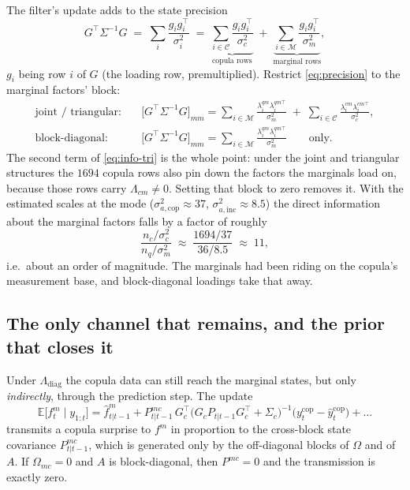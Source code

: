 \documentclass[11pt]{article}
\newcommand{\cop}{\mathrm{cop}}
\begin{document}
The filter's update adds to the state precision
\begin{equation}
  G^{\top}\Sigma^{-1}G \;=\; \sum_{i} \frac{g_i g_i^{\top}}{\sigma_i^2}
  \;=\; \underbrace{\sum_{i\in\mathcal{C}} \frac{g_i g_i^{\top}}{\sigma_c^2}}_{\text{copula rows}}
  \;+\; \underbrace{\sum_{i\in\mathcal{M}} \frac{g_i g_i^{\top}}{\sigma_m^2}}_{\text{marginal rows}},
  \label{eq:precision}
\end{equation}
$g_i$ being row $i$ of $G$ (the loading row, premultiplied). Restrict
\eqref{eq:precision} to the marginal factors' block:
\begin{align}
  \text{joint / triangular:}&\quad
  \bigl[G^{\top}\Sigma^{-1}G\bigr]_{mm} =
  \sum_{i\in\mathcal{M}} \frac{\lambda^{qm}_i \lambda^{qm\top}_i}{\sigma_m^2}
  \;+\; \sum_{i\in\mathcal{C}} \frac{\lambda^{cm}_i \lambda^{cm\top}_i}{\sigma_c^2},
  \label{eq:info-tri}\\[2pt]
  \text{block-diagonal:}&\quad
  \bigl[G^{\top}\Sigma^{-1}G\bigr]_{mm} =
  \sum_{i\in\mathcal{M}} \frac{\lambda^{qm}_i \lambda^{qm\top}_i}{\sigma_m^2}
  \qquad\text{only.}
  \label{eq:info-diag}
\end{align}
The second term of \eqref{eq:info-tri} is the whole point: under the joint and
triangular structures the $1694$ copula rows also pin down the factors the
marginals load on, because those rows carry $\Lambda_{cm} \neq 0$. Setting that
block to zero removes it. With the estimated scales at the mode
($\sigma^2_{a,\cop} \approx 37$, $\sigma^2_{a,\mathrm{inc}} \approx 8.5$) the
direct information about the marginal factors falls by a factor of roughly
\begin{equation}
  \frac{n_c/\sigma_c^2}{n_q/\sigma_m^2}
  \;\approx\; \frac{1694/37}{36/8.5} \;\approx\; 11 ,
\end{equation}
i.e.\ about an order of magnitude. The marginals had been riding on the
copula's measurement base, and block-diagonal loadings take that away.

\subsection{The only channel that remains, and the prior that closes it}

Under $\Lambda_{\mathrm{diag}}$ the copula data can still reach the marginal
states, but only \emph{indirectly}, through the prediction step. The update
\begin{equation}
  \mathbb{E}\bigl[f^m_t \mid y_{1:t}\bigr]
  = \hat f^m_{t|t-1}
  + P_{t|t-1}^{mc}\, G_c^{\top}\bigl(G_c P_{t|t-1} G_c^{\top} + \Sigma_c\bigr)^{-1}
    \bigl(y^{\cop}_t - \hat y^{\cop}_t\bigr) + \dots
  \label{eq:transmission}
\end{equation}
transmits a copula surprise to $f^m$ in proportion to the cross-block state
covariance $P^{mc}_{t|t-1}$, which is generated only by the off-diagonal blocks
of $\Omega$ and of $A$. If $\Omega_{mc} = 0$ and $A$ is block-diagonal, then
$P^{mc} = 0$ and the transmission is exactly zero.
\end{document}
